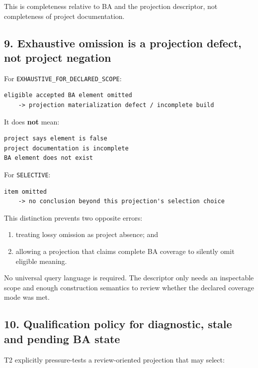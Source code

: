 \documentclass[11pt,a4paper]{article}
\providecommand{\tightlist}{\setlength{\itemsep}{0pt}\setlength{\parskip}{0pt}}
\begin{document}
This is completeness relative to BA and the projection descriptor, not
completeness of project documentation.

\subsection{9. Exhaustive omission is a projection defect, not project
negation}\label{9-exhaustive-omission-is-a-projection-defect-not-project-negation}

For \texttt{EXHAUSTIVE\_FOR\_DECLARED\_SCOPE}:

\begin{verbatim}
eligible accepted BA element omitted
    -> projection materialization defect / incomplete build
\end{verbatim}

It does \textbf{not} mean:

\begin{verbatim}
project says element is false
project documentation is incomplete
BA element does not exist
\end{verbatim}

For \texttt{SELECTIVE}:

\begin{verbatim}
item omitted
    -> no conclusion beyond this projection's selection choice
\end{verbatim}

This distinction prevents two opposite errors:

\begin{enumerate}
\def\labelenumi{\arabic{enumi}.}
\tightlist
\item
  treating lossy omission as project absence; and
\item
  allowing a projection that claims complete BA coverage to silently
  omit eligible meaning.
\end{enumerate}

No universal query language is required. The descriptor only needs an
inspectable scope and enough construction semantics to review whether
the declared coverage mode was met.

\subsection{10. Qualification policy for diagnostic, stale and pending
BA
state}\label{10-qualification-policy-for-diagnostic-stale-and-pending-ba-state}

T2 explicitly pressure-tests a review-oriented projection that may
select:
\end{document}
